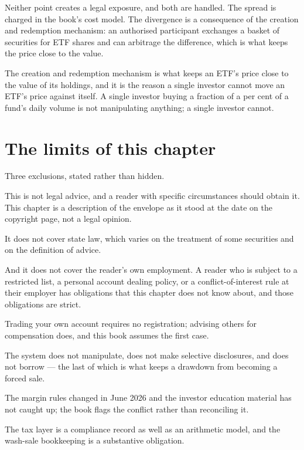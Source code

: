 Neither point creates a legal exposure, and both are handled. The spread
is charged in the book's cost model. The divergence is a consequence of
the creation and redemption mechanism: an authorised participant
exchanges a basket of securities for ETF shares and can arbitrage the
difference, which is what keeps the price close to the value.

\begin{takeaway}
The creation and redemption mechanism is what keeps an ETF's price close
to the value of its holdings, and it is the reason a single investor
cannot move an ETF's price against itself. A single investor buying a
fraction of a per cent of a fund's daily volume is not manipulating
anything; a single investor cannot.
\end{takeaway}

\section{The limits of this chapter}

Three exclusions, stated rather than hidden.

This is not legal advice, and a reader with specific circumstances should
obtain it. This chapter is a description of the envelope as it stood at
the date on the copyright page, not a legal opinion.

It does not cover state law, which varies on the treatment of some
securities and on the definition of advice.

And it does not cover the reader's own employment. A reader who is
subject to a restricted list, a personal account dealing policy, or a
conflict-of-interest rule at their employer has obligations that this
chapter does not know about, and those obligations are strict.

\begin{keytakeaways}
\item Trading your own account requires no registration; advising others
for compensation does, and this book assumes the first case.
\item The system does not manipulate, does not make selective disclosures,
and does not borrow --- the last of which is what keeps a drawdown from
becoming a forced sale.
\item The margin rules changed in June 2026 and the investor education
material has not caught up; the book flags the conflict rather than
reconciling it.
\item The tax layer is a compliance record as well as an arithmetic model,
and the wash-sale bookkeeping is a substantive obligation.
\end{keytakeaways}
